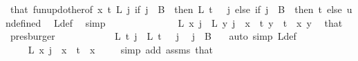 \begin{isabellebody}
\ that\ fun{\isacharunderscore}{\kern0pt}upd{\isacharunderscore}{\kern0pt}other{\isacharbrackleft}{\kern0pt}of\ x\ t\ L\ {\isachardoublequoteopen}{\isasymlambda}j{\isachardot}{\kern0pt}\ if\ j\ {\isasymin}\ B\ {}\ then\ L\ {\isacharparenleft}{\kern0pt}t\ {\isacharminus}{\kern0pt}\ {}{\isacharparenright}{\kern0pt}\ j\ else\ if\ j\ {\isasymin}\ B\ {}\ then\ t\ else\ undefined{\isachardoublequoteclose}{\isacharbrackright}{\kern0pt}\ \isamarkupfalse%
\ L{\isacharprime}{\kern0pt}{\isacharunderscore}{\kern0pt}def\ \isamarkupfalse%
\ simp\isanewline
\ \ \ \ \ \ \ \ \ \ \isamarkupfalse%
\ \isamarkupfalse%
\ {\isacharasterisk}{\kern0pt}{\isacharcolon}{\kern0pt}\ {\isachardoublequoteopen}L{\isacharprime}{\kern0pt}\ x\ j\ {\isacharequal}{\kern0pt}\ L{\isacharprime}{\kern0pt}\ y\ j{\isachardoublequoteclose}\ \ {\isachardoublequoteopen}x\ {\isacharless}{\kern0pt}\ t{\isachardoublequoteclose}\ {\isachardoublequoteopen}y\ {\isacharless}{\kern0pt}\ t{\isachardoublequoteclose}\ \ x\ y\ \isamarkupfalse%
\ that\ \isamarkupfalse%
\ presburger\isanewline
\isanewline
\ \ \ \ \ \ \ \ \ \ \isamarkupfalse%
\ {\isachardoublequoteopen}L{\isacharprime}{\kern0pt}\ t\ j\ {\isacharequal}{\kern0pt}\ L{\isacharprime}{\kern0pt}\ {\isacharparenleft}{\kern0pt}t\ {\isacharminus}{\kern0pt}\ {}{\isacharparenright}{\kern0pt}\ j{\isachardoublequoteclose}\ \isamarkupfalse%
\ {\isacartoucheopen}j\ {\isasymin}\ B\ {}{\isacartoucheclose}\ \isamarkupfalse%
\ {\isacharparenleft}{\kern0pt}auto\ simp{\isacharcolon}{\kern0pt}\ L{\isacharprime}{\kern0pt}{\isacharunderscore}{\kern0pt}def{\isacharparenright}{\kern0pt}\isanewline
\ \ \ \ \ \ \ \ \ \ \isamarkupfalse%
\ \isamarkupfalse%
\ {\isachardoublequoteopen}{\isachardot}{\kern0pt}{\isachardot}{\kern0pt}{\isachardot}{\kern0pt}\ {\isacharequal}{\kern0pt}\ L{\isacharprime}{\kern0pt}\ x\ j{\isachardoublequoteclose}\ \ {\isachardoublequoteopen}x\ {\isacharless}{\kern0pt}\ t{\isachardoublequoteclose}\ \ x\ \isamarkupfalse%
\ {\isacharasterisk}{\kern0pt}\ \isamarkupfalse%
\ {\isacharparenleft}{\kern0pt}simp\ add{\isacharcolon}{\kern0pt}\ assms{\isacharparenleft}{\kern0pt}{}{\isacharparenright}{\kern0pt}\ that{\isacharparenright}{\kern0pt}\isanewline
\ \ \ \ \ \ \ \ \ \ \isamarkupfalse%

\end{isabellebody}
